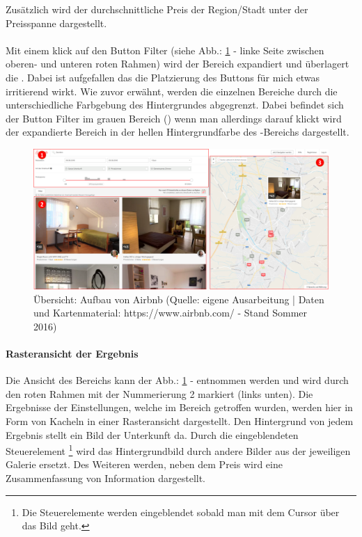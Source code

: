 \documentclass[../Bachelorarbeit.tex]{subfiles}
\begin{document}
Zusätzlich wird der durchschnittliche Preis der Region/Stadt unter der Preisspanne dargestellt.\\
\\
Mit einem klick auf den Button Filter (siehe Abb.: \ref{fig:airbnbOverview} - linke Seite zwischen oberen- und unteren roten Rahmen) wird der Bereich  expandiert und überlagert die  .
Dabei ist aufgefallen das die Platzierung des Buttons für mich etwas irritierend wirkt. 
Wie zuvor erwähnt, werden die einzelnen Bereiche durch die unterschiedliche Farbgebung des Hintergrundes abgegrenzt. 
Dabei befindet sich der Button Filter im grauen Bereich () wenn man allerdings darauf klickt wird der expandierte Bereich in der hellen Hintergrundfarbe des -Bereichs dargestellt.


\begin{figure}[H]
\centering
\includegraphics[width=1\linewidth]{img/StandDerTechnik/airbnbOverview}
\caption[Übersicht: Aufbau von Airbnb]{Übersicht: Aufbau von Airbnb (Quelle: eigene Ausarbeitung | Daten und Kartenmaterial: https://www.airbnb.com/ - Stand Sommer 2016)}
\label{fig:airbnbOverview}
\end{figure}

\paragraph{Rasteransicht der Ergebnis}
\label{airbnb:gridview}
Die Ansicht des Bereichs kann der Abb.: \ref{fig:airbnbOverview} -  entnommen werden und wird durch den roten Rahmen mit der Nummerierung 2 markiert (links unten).
Die Ergebnisse der Einstellungen, welche im Bereich  getroffen wurden, werden hier in Form von Kacheln in einer Rasteransicht dargestellt.
Den Hintergrund von jedem Ergebnis stellt ein Bild der Unterkunft da. 
Durch die eingeblendeten Steuerelement
	\footnote{Die Steuerelemente werden eingeblendet sobald man mit dem Cursor über das Bild geht.} 
wird das Hintergrundbild durch andere Bilder aus der jeweiligen Galerie ersetzt. 
Des Weiteren werden, neben dem Preis wird eine Zusammenfassung von Information  dargestellt. 
\end{document}

